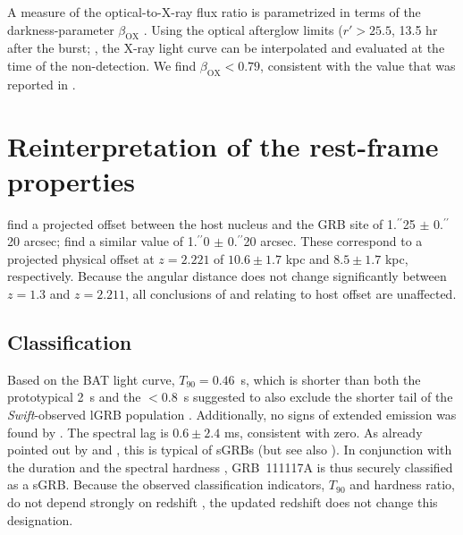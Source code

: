 \documentclass[longauth]{aa}    %
\newcommand{\farc}{\hbox{$.\!\!^{\prime\prime}$}}
\begin{document}
A measure of the optical-to-X-ray flux ratio is parametrized in terms of the
darkness-parameter $\beta_\mathrm{OX} $ \citep{Jakobsson2004}. Using the optical
afterglow limits ($r' > 25.5$, 13.5 hr after the burst; \citealt{Cucchiara2011,
        Cenko2011}, the X-ray light curve can be interpolated and evaluated at the time
of the non-detection. We find $\beta_\mathrm{OX} < 0.79$, consistent with the value that  was
reported in \citet{Sakamoto2013}.

\section{Reinterpretation of the rest-frame properties}

\citet{Margutti2012} find a projected offset between the host nucleus and the
GRB site of 1\farc25 $\pm$ 0\farc20 arcsec; \citet{Sakamoto2013}
find a similar value of 1\farc0 $\pm$ 0\farc20 arcsec. These correspond
to a projected physical offset at $z = 2.221$ of $10.6 \pm 1.7$ kpc and $8.5 \pm
1.7$ kpc, respectively. Because the angular distance does not change
significantly between $z = 1.3$ and $z = 2.211$, all conclusions of
\citet{Margutti2012} and \citet{Sakamoto2013} relating to host offset are
unaffected.

\subsection{Classification} \label{classification}

Based on the BAT light curve, $T_{90}=0.46$~s, which is shorter than both the
prototypical 2~s \citep{Kouveliotou1993} and the $<0.8$~s suggested to also
exclude the shorter tail of the \textit{Swift}-observed lGRB population
\citep{Bromberg2012a}. Additionally, no signs of extended emission was found by
\citet{Sakamoto2013}. The spectral lag is $0.6 \pm2.4$ ms, consistent with zero.
As already pointed out by \citet{Margutti2012} and \citet{Sakamoto2013}, this is
typical of sGRBs (but see also \citealt{Bernardini2015}). In conjunction
with the duration and the spectral hardness \citep{Sakamoto2011}, GRB~111117A is
thus securely classified as a sGRB. Because the observed classification
indicators, $T_{90}$ and hardness ratio, do not depend strongly on redshift
\citep{Littlejohns2013a}, the updated redshift does not change this designation.
\end{document}
